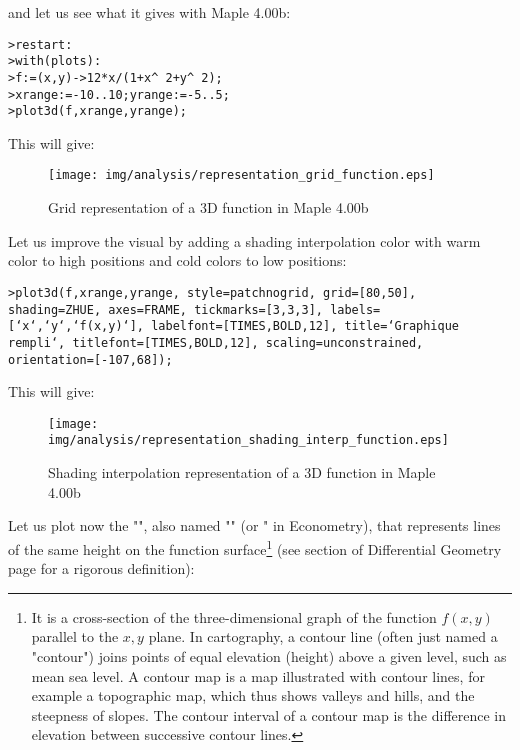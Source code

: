 	and let us see what it gives with Maple 4.00b:

	\texttt{>restart:}\\
	\texttt{>with(plots):}\\
	\texttt{>f:=(x,y)->12*x/(1+x\string^ 2+y\string^ 2);}\\
	\texttt{>xrange:=-10..10;yrange:=-5..5;}\\
	\texttt{>plot3d(f,xrange,yrange);}
	
	This will give:
	
	\begin{figure}[H]
		\centering
		\texttt{[image: img/analysis/representation\_grid\_function.eps]}
		\vspace*{3mm}
		\caption{Grid representation of a 3D function in Maple 4.00b}
	\end{figure}
	
	Let us improve the visual by adding a shading interpolation color with warm color to high positions and cold colors to low positions:
	
	\texttt{>plot3d(f,xrange,yrange, style=patchnogrid, grid=[80,50], shading=ZHUE, axes=FRAME, tickmarks=[3,3,3], labels=[`x`,`y`,`f(x,y)`], labelfont=[TIMES,BOLD,12], title=`Graphique rempli`, titlefont=[TIMES,BOLD,12], scaling=unconstrained, orientation=[-107,68]);}
	
	This will give:
	
	\begin{figure}[H]
		\centering
		\texttt{[image: img/analysis/representation\_shading\_interp\_function.eps]}
		\vspace*{3mm}
		\caption{Shading interpolation representation of a 3D function in Maple 4.00b}
	\end{figure}
	
	Let us plot now the "", also named "\label{isoline}" (or " in Econometry), that represents lines of the same height on the function surface\footnote{It is a cross-section of the three-dimensional graph of the function $f(x, y)$ parallel to the $x, y$ plane. In cartography, a contour line (often just named a "contour") joins points of equal elevation (height) above a given level, such as mean sea level. A contour map is a map illustrated with contour lines, for example a topographic map, which thus shows valleys and hills, and the steepness of slopes. The contour interval of a contour map is the difference in elevation between successive contour lines.} (see section of Differential Geometry page \pageref{isoline} for a rigorous definition):

